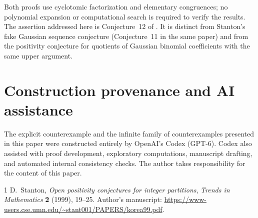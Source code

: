 \documentclass[11pt]{article}
\begin{document}
Both proofs use cyclotomic factorization and elementary congruences;
no polynomial expansion or computational search is required to verify
the results. The assertion addressed here is
Conjecture~12 of \cite{Stanton}. It is distinct from Stanton's fake
Gaussian sequence conjecture (Conjecture~11 in the same paper) and
from the positivity conjecture for quotients of Gaussian binomial
coefficients with the same upper argument.

\section*{Construction provenance and AI assistance}
The explicit counterexample and the infinite family of counterexamples
presented in this paper were constructed entirely by OpenAI's Codex
(GPT-6). Codex also assisted with proof development, exploratory
computations, manuscript drafting, and automated internal consistency
checks. The author takes responsibility for the content of this paper.

\begin{thebibliography}{1}
D.~Stanton,
\emph{Open positivity conjectures for integer partitions},
\emph{Trends in Mathematics} \textbf{2} (1999), 19--25.
Author's manuscript:
\url{https://www-users.cse.umn.edu/~stant001/PAPERS/korea99.pdf}.
\end{thebibliography}
\end{document}
